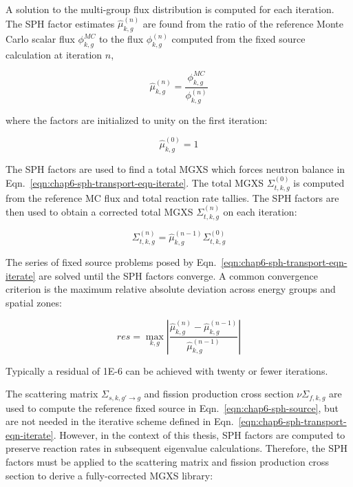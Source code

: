 \noindent A solution to the multi-group flux distribution is computed for each iteration. The \ac{SPH} factor estimates $\hat{\mu}_{k,g}^{(n)}$ are found from the ratio of the reference Monte Carlo scalar flux $\phi_{k,g}^{MC}$ to the flux $\phi_{k,g}^{(n)}$ computed from the fixed source calculation at iteration $n$,

\begin{equation}
\label{eqn:chap6-sph-update}
\hat{\mu}_{k,g}^{(n)} = \frac{\phi_{k,g}^{MC}}{\phi_{k,g}^{(n)}}
\end{equation}

\noindent where the factors are initialized to unity on the first iteration:

\begin{dmath}
\label{eqn:chap6-sph-initial}
\hat{\mu}_{k,g}^{(0)} = 1
\end{dmath}

The \ac{SPH} factors are used to find a total \ac{MGXS} which forces neutron balance in Eqn.~\ref{eqn:chap6-sph-transport-eqn-iterate}. The total \ac{MGXS} $\Sigma_{t,k,g}^{(0)}$ is computed from the reference \ac{MC} flux and total reaction rate tallies. The \ac{SPH} factors are then used to obtain a corrected total \ac{MGXS} $\Sigma_{t,k,g}^{(n)}$ on each iteration:

\begin{dmath}
\label{eqn:chap6-sph-update-sigt}
\Sigma_{t,k,g}^{(n)} = \hat{\mu}_{k,g}^{(n-1)}\Sigma_{t,k,g}^{(0)}
\end{dmath}

The series of fixed source problems posed by Eqn.~\ref{eqn:chap6-sph-transport-eqn-iterate} are solved until the \ac{SPH} factors converge. A common convergence criterion is the maximum relative absolute deviation across energy groups and spatial zones:

\begin{dmath}
\label{eqn:chap6-sph-residual}
res = \max_{k,g} \left|\frac{\hat{\mu}_{k,g}^{(n)} - \hat{\mu}_{k,g}^{(n-1)}}{\hat{\mu}_{k,g}^{(n-1)}}\right|
\end{dmath}

\noindent Typically a residual of 1E-6 can be achieved with twenty or fewer iterations.

The scattering matrix $\Sigma_{s,k,g'\rightarrow g}$ and fission production cross section $\nu\Sigma_{f,k,g}$ are used to compute the reference fixed source in Eqn.~\ref{eqn:chap6-sph-source}, but are not needed in the iterative scheme defined in Eqn.~\ref{eqn:chap6-sph-transport-eqn-iterate}. However, in the context of this thesis, \ac{SPH} factors are computed to preserve reaction rates in subsequent eigenvalue calculations. Therefore, the \ac{SPH} factors must be applied to the scattering matrix and fission production cross section to derive a fully-corrected \ac{MGXS} library:

